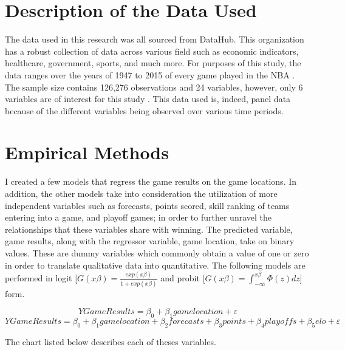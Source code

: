 \documentclass[12pt,english]{article}
\begin{document}
\section{Description of the Data Used }\label{sec:data}
The data used in this research was all sourced from DataHub. This organization has a robust collection of data across various field such as economic indicators, healthcare, government, sports, and much more. For purposes of this study, the data ranges over the years of 1947 to 2015 of every game played in the NBA \citep{adam}. The sample size contains 126,276 observations and 24 variables, however, only 6 variables are of interest for this study \citep{adam}. This data used is, indeed, panel data because of the different variables being observed over various time periods. 



\section{Empirical Methods}\label{sec:methods}

I created a few models that regress the game results on the game locations. In addition, the other models take into consideration the utilization of more independent variables such as forecasts, points scored, skill ranking of teams entering into a game, and playoff games; in order to further unravel the relationships that these variables share with winning. The predicted variable, game results, along with the regressor variable, game location, take on binary values. These are dummy variables which commonly obtain a value of one or zero in order to translate qualitative data into quantitative. The following models are performed in logit [$G(x\beta) = \frac{exp(x\beta)}{1+exp(x\beta)}$ and probit [$G(x\beta) =  \int_{-\infty}^{x\beta} \Phi (z)dz$] form.

\begin{equation}
\label{eq:1}
YGame Results=\beta_{0} + \beta_{1}{game location} + \varepsilon
\end{equation}
\begin{equation}
\label{eq:2}
YGame Results=\beta_{0} + \beta_{1}{game location} + \beta_{2}forecasts + \beta_{3}points+\beta_{4}playoffs+\beta_{5}elo + \varepsilon
\end{equation}

The chart listed below describes each of theses variables.
\end{document}
